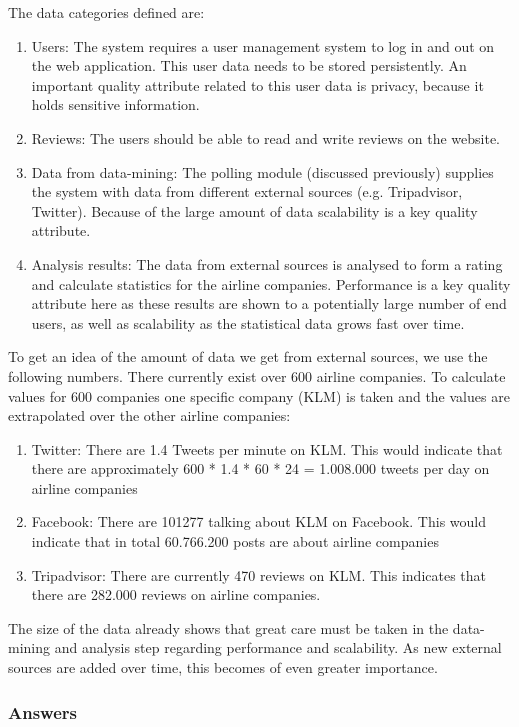 The data categories defined are:
\begin{enumerate}
\item Users: The system requires a user management system to log in and out on the web application. This user data needs to be stored persistently. An important quality attribute related to this user data is privacy, because it holds sensitive information.
\item Reviews: The users should be able to read and write reviews on the website.
\item Data from data-mining: The polling module (discussed previously) supplies the system with data from different external sources (e.g. Tripadvisor, Twitter). Because of the large amount of data scalability is a key quality attribute.
\item Analysis results: The data from external sources is analysed to form a rating and calculate statistics for the airline companies. Performance is a key quality attribute here as these results are shown to a potentially large number of end users, as well as scalability as the statistical data grows fast over time.
\end{enumerate}

To get an idea of the amount of data we get from external sources, we use the following numbers. There currently exist over 600 airline companies. To calculate values for 600 companies one specific company (KLM) is taken and the values are extrapolated over the other airline companies:
\begin{enumerate}
\item Twitter: There are 1.4 Tweets per minute on KLM. This would indicate that there are approximately 600 * 1.4 * 60 * 24 = 1.008.000 tweets per day on airline companies
\item Facebook: There are 101277 talking about KLM on Facebook. This would indicate that in total 60.766.200 posts are about airline companies
\item Tripadvisor: There are currently 470 reviews on KLM. This indicates that there are 282.000 reviews on airline companies.
\end{enumerate}
The size of the data already shows that great care must be taken in the data-mining and analysis step regarding performance and scalability. As new external sources are added over time, this becomes of even greater importance.


\subsubsection{Answers}
